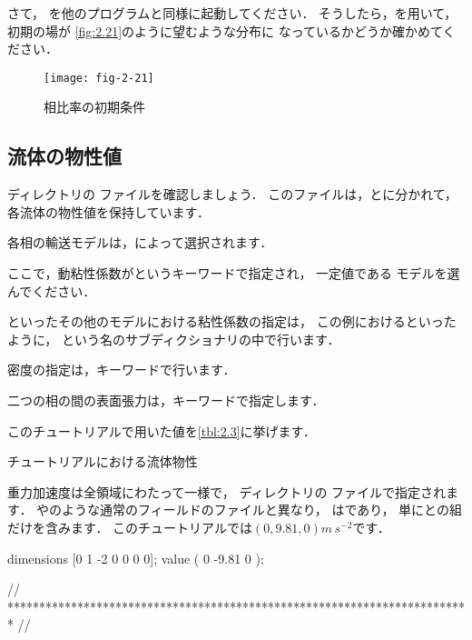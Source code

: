 さて，
%
%
を他のプログラムと同様に起動してください．
そうしたら，を用いて，初期の場が
\autoref{fig:2.21}のように望むような分布に
なっているかどうか確かめてください．


\begin{figure}[ht]
 \texttt{[image: fig-2-21]}
 \caption{相比率の初期条件}
 \label{fig:2.21}
\end{figure}


\subsection{流体の物性値}
\label{ssec:2.3.4}
ディレクトリの
%
%
ファイルを確認しましょう．
このファイルは，とに分かれて，
各流体の物性値を保持しています．

各相の輸送モデルは，によって選択されます．

ここで，動粘性係数がというキーワードで指定され，
一定値である
%
%
モデルを選んでください．

%
%
といったその他のモデルにおける粘性係数の指定は，
この例におけるといったように，
という名のサブディクショナリの中で行います．

密度の指定は，キーワードで行います．

二つの相の間の表面張力は，キーワードで指定します．

このチュートリアルで用いた値を\autoref{tbl:2.3}に挙げます．


\begin{table}
 
 \caption{チュートリアルにおける流体物性}
 \label{tbl:2.3}
\end{table}


重力加速度は全領域にわたって一様で，
ディレクトリの
%
%
ファイルで指定されます．
やのような通常のフィールドのファイルと異なり，
はであり，
単にとの組だけを含みます．
このチュートリアルでは$(0, 9.81, 0)\unit{m\,s^{-2}}$です．
\begin{OFverbatim}[file, linenum=17]

dimensions      [0 1 -2 0 0 0 0];
value           ( 0 -9.81 0 );


// ************************************************************************* //
\end{OFverbatim}


